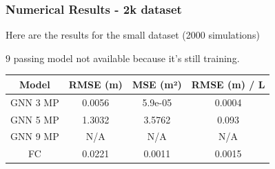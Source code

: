 \documentclass{beamer}
\begin{document}
\begin{frame}
    \frametitle{Numerical Results - 2k dataset}
    Here are the results for the small dataset (2000 simulations)

    \(9\) passing model not available because it's still training.
    \begin{table}
        \centering
        \begin{tabular}{|c|c|c|c|}
            \hline
            Model & RMSE (m) & MSE (m²) & RMSE (m) / L \\
            \hline
            GNN 3 MP & 0.0056 & 5.9e-05 & 0.0004 \\
            \hline
            GNN 5 MP & 1.3032 & 3.5762 & 0.093 \\
            \hline
            GNN 9 MP & N/A & N/A & N/A \\
            \hline
            FC & 0.0221 & 0.0011 & 0.0015 \\
            \hline
        \end{tabular}
    \end{table}
\end{frame}
\end{document}
